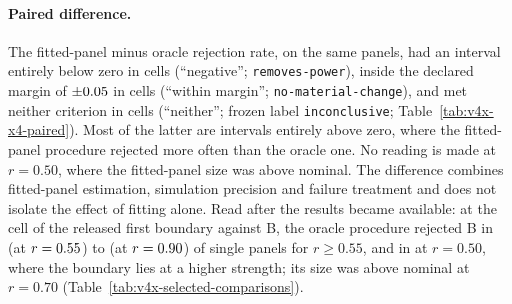 \paragraph{Paired difference.}
The fitted-panel minus oracle rejection rate, on the same panels, had an interval entirely below zero in  cells (``negative''; \texttt{removes-power}), inside the declared margin of $\pm\resultnum{v4x.x4.summary.single_panel_effect.margin}{0.05}$ in  cells (``within margin''; \texttt{no-material-change}), and met neither criterion in  cells (``neither''; frozen label \texttt{inconclusive}; Table~\ref{tab:v4x-x4-paired}). Most of the latter are intervals entirely above zero, where the fitted-panel procedure rejected more often than the oracle one. No reading is made at $r=0.50$, where the fitted-panel size was above nominal. The difference combines fitted-panel estimation, simulation precision and failure treatment and does not isolate the effect of fitting alone.
Read after the results became available: at the cell of the released first boundary against B, the oracle procedure rejected B in  (at $r=\resultnum{j.x4a.boundary_rejection.min.r}{0.55}$) to  (at $r=\resultnum{j.x4a.boundary_rejection.max.r}{0.90}$) of single panels for $r\ge0.55$, and in  at $r=0.50$, where the boundary lies at a higher strength; its size was above nominal at $r=0.70$ (Table~\ref{tab:v4x-selected-comparisons}).







\clearpage

